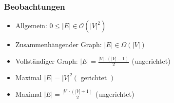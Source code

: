 \documentclass[german]{latex4ei/latex4ei_sheet}
\begin{document}
\begin{sectionbox}
\subsubsection{Beobachtungen}\par
\begin{itemize}
    \item Allgemein: $0 \leq|E| \in \mathcal{O}\left(|V|^{2}\right)$
    \item Zusammenhängender Graph: $|E| \in \Omega(|V|)$
    \item Vollständiger Graph: $|E|=\frac{|V| \cdot(|V|-1)}{2}$ (ungerichtet)
    \item Maximal $|E|=|V|^{2}(\text { gerichtet })$
    \item Maximal $|E|=\frac{|V| \cdot(|V|+1)}{2}$ (ungerichtet)
\end{itemize}\par\smallskip
\end{sectionbox}

\vspace{100px}
\end{document}
